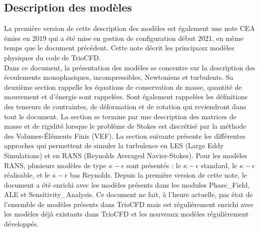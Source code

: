 \subsection{\label{subsec:modeles}Description des mod\`eles}
La première version de cette description des modèles est également une note CEA émise en 2019
qui a été mise en gestion de configuration début 2021,
en même temps que le document précédent.
Cette note décrit les principaux modèles physiques du code de TrioCFD.\\
Dans ce document, la présentation des modèles se concentre sur la description
des écoulements monophasiques, incompressibles, Newtoniens et turbulents.
Sa deuxième section rappelle les équations de conservation de masse, quantité de mouvement et d'énergie sont rappelées.
Sont également rappelées les définitions des tenseurs de contraintes,
de déformation et de rotation qui reviendront dans tout le document.
La section se termine par une description des matrices de masse et de rigidité lorsque
le problème de Stokes est discrétisé par la méthode des Volumes-Éléments Finis (VEF).
La section suivante présente les différentes approches qui permettent de simuler la
turbulence en LES (Large Eddy Simulations) et en RANS (Reynolds Averaged Navier-Stokes).
Pour les modèles RANS, plusieurs modèles de type $\kappa-\epsilon$ sont présentés :
le $\kappa-\epsilon$ standard,
le $\kappa-\epsilon$ réalisable,
et le $\kappa-\epsilon$ bas Reynolds.
Depuis la première version de cette note, le document a été enrichi avec les modèles présents dans les modules Phase\_Field, ALE et Sensitivity\_Analysis.
Ce document ne fait, à l'heure actuelle, pas état de l'ensemble de modèles présents dans TrioCFD
mais est régulièrement enrichi avec les modèles déjà existants dans TrioCFD
et les nouveaux modèles régulièrement développés.


